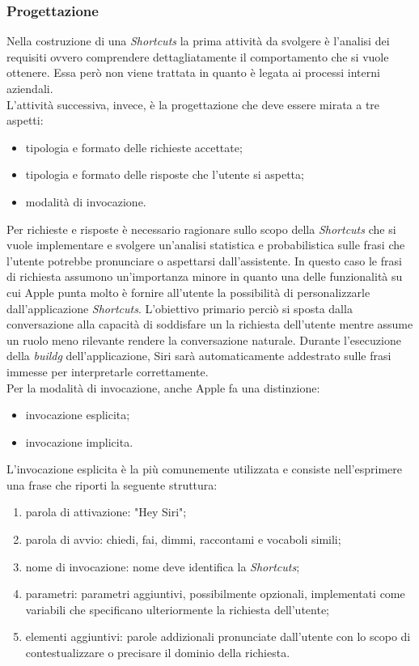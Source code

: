 		\subsubsection{Progettazione}
		Nella costruzione di una \emph{Shortcuts} la prima attività da svolgere è l'analisi dei requisiti ovvero comprendere dettagliatamente il comportamento che si vuole ottenere. Essa però non viene trattata in quanto è legata ai processi interni aziendali. \\
		L'attività successiva, invece, è la progettazione che deve essere mirata a tre aspetti:
		\begin{itemize}
			\item tipologia e formato delle richieste accettate;
			\item tipologia e formato delle risposte che l'utente si aspetta;
			\item modalità di invocazione.
		\end{itemize}
		Per richieste e risposte è necessario ragionare sullo scopo della \emph{Shortcuts} che si vuole implementare e svolgere un'analisi statistica e probabilistica sulle frasi che l'utente potrebbe pronunciare o aspettarsi dall'assistente. In questo caso le frasi di richiesta assumono un'importanza minore in quanto una delle funzionalità su cui Apple punta molto è fornire all'utente la possibilità di personalizzarle dall'applicazione \emph{Shortcuts}. L'obiettivo primario perciò si sposta dalla conversazione alla capacità di soddisfare un la richiesta dell'utente mentre assume un ruolo meno rilevante rendere la conversazione naturale. Durante l'esecuzione della \emph{\gls{buildg}} dell'applicazione, Siri sarà automaticamente addestrato sulle frasi immesse per interpretarle correttamente. \\
		Per la modalità di invocazione, anche Apple fa una distinzione:
		\begin{itemize}
			\item invocazione esplicita;
			\item invocazione implicita.
		\end{itemize}
		L'invocazione esplicita è la più comunemente utilizzata e consiste nell'esprimere una frase che riporti la seguente struttura:
		\begin{enumerate}
			\item parola di attivazione: "Hey Siri";
			\item parola di avvio: chiedi, fai, dimmi, raccontami e vocaboli simili;
			\item nome di invocazione: nome deve identifica la \emph{Shortcuts};
			\item parametri: parametri aggiuntivi, possibilmente opzionali, implementati come variabili che specificano ulteriormente la richiesta dell'utente;
			\item elementi aggiuntivi: parole addizionali pronunciate dall'utente con lo scopo di contestualizzare o precisare il dominio della richiesta.
		\end{enumerate}

